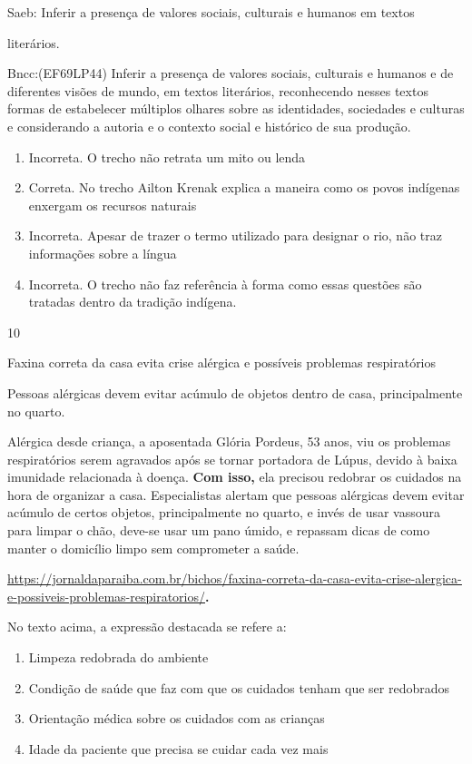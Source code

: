{{\begin{escolha}
{\begin{itemize}
\begin{itemize}
Saeb: Inferir a presença de valores sociais, culturais e humanos em
textos

literários.

Bncc:(EF69LP44) Inferir a presença de valores sociais, culturais e
humanos e de diferentes visões de mundo, em textos literários,
reconhecendo nesses textos formas de estabelecer múltiplos olhares sobre
as identidades, sociedades e culturas e considerando a autoria e o
contexto social e histórico de sua produção.

\begin{enumerate}
\def\labelenumi{\arabic{enumi}.}
\item
  Incorreta. O trecho não retrata um mito ou lenda
\item
  Correta. No trecho Ailton Krenak explica a maneira como os povos
  indígenas enxergam os recursos naturais
\item
  Incorreta. Apesar de trazer o termo utilizado para designar o rio, não
  traz informações sobre a língua
\item
  Incorreta. O trecho não faz referência à forma como essas questões são
  tratadas dentro da tradição indígena.
\end{enumerate}

\num{10}

Faxina correta da casa evita crise alérgica e possíveis problemas
respiratórios

Pessoas alérgicas devem evitar acúmulo de objetos dentro de casa,
principalmente no quarto.

Alérgica desde criança, a aposentada Glória Pordeus, 53 anos, viu os
problemas respiratórios serem agravados após se tornar portadora de
Lúpus, devido à baixa imunidade relacionada à doença. \textbf{Com isso,}
ela precisou redobrar os cuidados na hora de organizar a casa.
Especialistas alertam que pessoas alérgicas devem evitar acúmulo de
certos objetos, principalmente no quarto, e invés de usar vassoura para
limpar o chão, deve-se usar um pano úmido, e repassam dicas de como
manter o domicílio limpo sem comprometer a saúde.

\href{https://jornaldaparaiba.com.br/bichos/faxina-correta-da-casa-evita-crise-alergica-e-possiveis-problemas-respiratorios/}{\uline{https://jornaldaparaiba.com.br/bichos/faxina-correta-da-casa-evita-crise-alergica-e-possiveis-problemas-respiratorios/}}\textbf{.}

No texto acima, a expressão destacada se refere a:

\begin{enumerate}
\def\labelenumi{\alph{enumi})}
\item
  Limpeza redobrada do ambiente
\item
  Condição de saúde que faz com que os cuidados tenham que ser
  redobrados
\item
  Orientação médica sobre os cuidados com as crianças
\item
  Idade da paciente que precisa se cuidar cada vez mais
\end{enumerate}


\end{itemize}
\end{itemize}}
\end{escolha}}}
